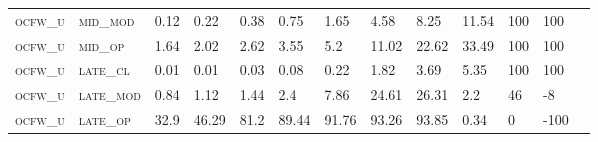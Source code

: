 \begin{sidewaystable}[!htbp]
\begin{tabular}{@{}lllllllllllll@{}}
\footnotesize \textsc{ocfw\_u}     & \footnotesize \textsc{mid\_mod  }                & \footnotesize 0.12            & \footnotesize 0.22            & \footnotesize 0.38             & \footnotesize 0.75             & \footnotesize 1.65             & \footnotesize 4.58             & \footnotesize 8.25       & \footnotesize 11.54    & \footnotesize 100    & \footnotesize 100      \\
\footnotesize \textsc{ocfw\_u}     & \footnotesize \textsc{mid\_op   }                & \footnotesize 1.64            & \footnotesize 2.02            & \footnotesize 2.62             & \footnotesize 3.55             & \footnotesize 5.2              & \footnotesize 11.02            & \footnotesize 22.62      & \footnotesize 33.49    & \footnotesize 100    & \footnotesize 100      \\
\footnotesize \textsc{ocfw\_u}     & \footnotesize \textsc{late\_cl  }                & \footnotesize 0.01            & \footnotesize 0.01            & \footnotesize 0.03             & \footnotesize 0.08             & \footnotesize 0.22             & \footnotesize 1.82             & \footnotesize 3.69       & \footnotesize 5.35     & \footnotesize 100    & \footnotesize 100      \\
\footnotesize \textsc{ocfw\_u}     & \footnotesize \textsc{late\_mod }                & \footnotesize 0.84            & \footnotesize 1.12            & \footnotesize 1.44             & \footnotesize 2.4              & \footnotesize 7.86             & \footnotesize 24.61            & \footnotesize 26.31      & \footnotesize 2.2      & \footnotesize 46     & \footnotesize -8       \\
\footnotesize \textsc{ocfw\_u}     & \footnotesize \textsc{late\_op  }                & \footnotesize 32.9            & \footnotesize 46.29           & \footnotesize 81.2             & \footnotesize 89.44            & \footnotesize 91.76            & \footnotesize 93.26            & \footnotesize 93.85      & \footnotesize 0.34     & \footnotesize 0      & \footnotesize -100     \\
\end{tabular}
\end{sidewaystable}


